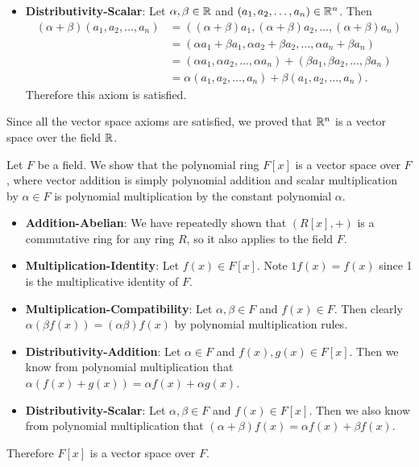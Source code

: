 \begin{example}
\begin{itemize}
        \item \textbf{Distributivity-Scalar}: Let $\alpha, \beta \in \mathbb{R}$ and $(a_1, a_2, \dots, a_n) \in \mathbb{R}^n$. Then
        \begin{align*}
            (\alpha+\beta)(a_1, a_2, \dots, a_n) &= ((\alpha+\beta)a_1, (\alpha+\beta)a_2, \dots, (\alpha+\beta)a_n)\\
            &= (\alpha a_1 + \beta a_1, \alpha a_2 + \beta a_2, \dots, \alpha a_n + \beta a_n)\\
            &= (\alpha a_1, \alpha a_2, \dots, \alpha a_n) + (\beta a_1, \beta a_2, \dots, \beta a_n)\\
            &= \alpha(a_1, a_2, \dots, a_n) + \beta(a_1, a_2, \dots, a_n).
        \end{align*}
        Therefore this axiom is satisfied.
    \end{itemize}
    
    Since all the vector space axioms are satisfied, we proved that $\mathbb{R}^n$ is a vector space over the field $\mathbb{R}$.
\end{example}

\begin{example}\label{example-polynomial-ring-over-field-is-vector-space}
    Let $F$ be a field. We show that the polynomial ring $F[x]$ is a vector space over $F$, where vector addition is simply polynomial addition and scalar multiplication by $\alpha \in F$ is polynomial multiplication by the constant polynomial $\alpha$.
    \begin{itemize}
        \item \textbf{Addition-Abelian}: We have repeatedly shown that $(R[x], +)$ is a commutative ring for any ring $R$, so it also applies to the field $F$.
        
        \item \textbf{Multiplication-Identity}: Let $f(x) \in F[x]$. Note $1f(x) = f(x)$ since 1 is the multiplicative identity of $F$.

        \item \textbf{Multiplication-Compatibility}: Let $\alpha, \beta \in F$ and $f(x) \in F$. Then clearly $\alpha(\beta f(x)) = (\alpha\beta)f(x)$ by polynomial multiplication rules.
        
        \item \textbf{Distributivity-Addition}: Let $\alpha \in F$ and $f(x), g(x) \in F[x]$. Then we know from polynomial multiplication that $\alpha(f(x) + g(x)) = \alpha f(x) + \alpha g(x)$.
        
        \item \textbf{Distributivity-Scalar}: Let $\alpha, \beta \in F$ and $f(x) \in F[x]$. Then we also know from polynomial multiplication that $(\alpha+\beta)f(x) = \alpha f(x) + \beta f(x)$.
    \end{itemize}
    Therefore $F[x]$ is a vector space over $F$.
\end{example}

